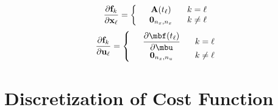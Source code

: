 \begin{equation}
     \frac{\partial \mathbf{f}_k}{\partial \mathbf{x}_{\ell}} = 
     \left\{ \begin{array}{ccc}
    &\mathbf{A}(t_\ell) \hspace{.1 in} & k = \ell \\
    &\mathbf{0}_{n_x,n_x}  \hspace{.1 in} & k \neq \ell  \\
    \end{array} \right. 
\end{equation}
%
\begin{equation} 
     \frac{\partial \mathbf{f}_k}{\partial \mathbf{u}_{\ell}} = 
          \left\{ \begin{array}{ccc}
          & \displaystyle\frac{\partial \mbf(t_\ell)}{\partial \mbu} \hspace{.1 in} & k = \ell \\
          &\mathbf{0}_{n_x,n_u}  \hspace{.1 in} & k \neq \ell  \\
          \end{array} \right. 
\end{equation}

\section{Discretization of Cost Function}